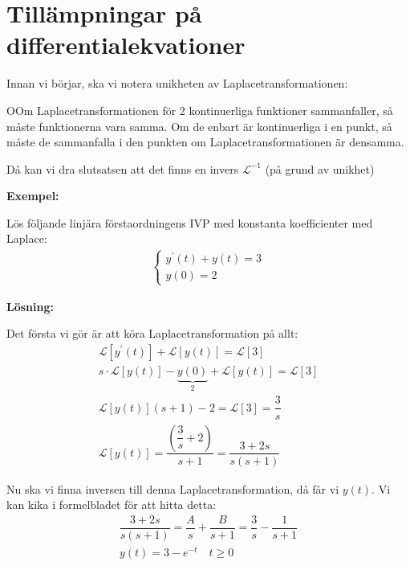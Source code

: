 \section{Tillämpningar på differentialekvationer}\par
\noindent Innan vi börjar, ska vi notera unikheten av Laplacetransformationen:
\par\bigskip
\begin{theo}
  OOm Laplacetransformationen för 2 kontinuerliga funktioner sammanfaller, så måste funktionerna vara samma.
  \noindent Om de enbart är kontinuerliga i en punkt, så måste de sammanfalla i den punkten om Laplacetransformationen är densamma. 
\end{theo}
\par\bigskip
\noindent Då kan vi dra slutsatsen att det finns en invers $\mathcal{L}^{-1}$ (på grund av unikhet)
\par\bigskip
\noindent\textbf{Exempel:}\par
\noindent Lös följande linjära förstaordningens IVP med konstanta koefficienter med Laplace:
\begin{equation*}
  \begin{gathered}
    \begin{cases*}
      y^{\prime}(t) +y(t)=3\\
      y(0) = 2
    \end{cases*}
  \end{gathered}
\end{equation*}
\par\bigskip
\noindent\textbf{Lösning:}\par
\noindent Det första vi gör är att köra Laplacetransformation på allt:
\begin{equation*}
  \begin{gathered}
    \mathcal{L}[y^{\prime}(t)]+\mathcal{L}[y(t)] = \mathcal{L}[3]\\
    s\cdot\mathcal{L}[y(t)]-\underbrace{y(0)}_{\text{2}}+\mathcal{L}[y(t)] = \mathcal{L}[3]\\
    \mathcal{L}[y(t)](s+1) -2 = \mathcal{L}[3] = \dfrac{3}{s}\\
    \mathcal{L}[y(t)] = \dfrac{\left(\dfrac{3}{s}+2\right)}{s+1} = \dfrac{3+2s}{s(s+1)}
  \end{gathered}
\end{equation*}
\par\bigskip
\noindent Nu ska vi finna inversen till denna Laplacetransformation, då får vi $y(t)$. Vi kan kika i formelbladet för att hitta detta:
\begin{equation*}
  \begin{gathered}
    \dfrac{3+2s}{s(s+1)} = \dfrac{A}{s}+\dfrac{B}{s+1} = \dfrac{3}{s}-\dfrac{1}{s+1}\\
    y(t) = 3-e^{-t}\quad t\geq0
  \end{gathered}
\end{equation*}
